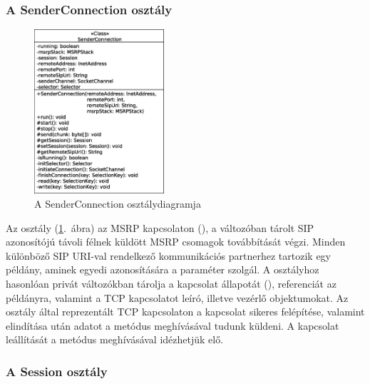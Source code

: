 \subsubsection*{A SenderConnection osztály}
\label{sec:msrp_senderconnection}

\begin{figure}
  \vspace{-15pt}
  \begin{center}
    \includegraphics[width=0.43\textwidth]{img/class_diagrams/SenderConnection.eps}
  \end{center}
  \vspace{-15pt}
  \captionsetup{font=scriptsize}
  \caption{A SenderConnection osztálydiagramja}
   \label{fig:class_senderconnection}
  \vspace{-10pt}
\end{figure}
Az osztály (\ref{fig:class_senderconnection}.~ábra) az MSRP kapcsolaton (), a  változóban tárolt SIP azonosítójú távoli félnek küldött MSRP csomagok továbbítását végzi. Minden különböző SIP URI-val rendelkező kommunikációs partnerhez tartozik egy  példány, aminek egyedi azonosítására a  paraméter szolgál. A  osztályhoz hasonlóan privát változókban tárolja a kapcsolat állapotát (), referenciát az  példányra, valamint a TCP kapcsolatot leíró, illetve vezérlő objektumokat. Az osztály által reprezentált TCP kapcsolaton a kapcsolat sikeres felépítése, valamint elindítása után adatot a  metódus meghívásával tudunk küldeni. A kapcsolat leállítását a  metódus meghívásával idézhetjük elő.

\newpage
\subsubsection*{A Session osztály}
\label{sec:msrp_session}

